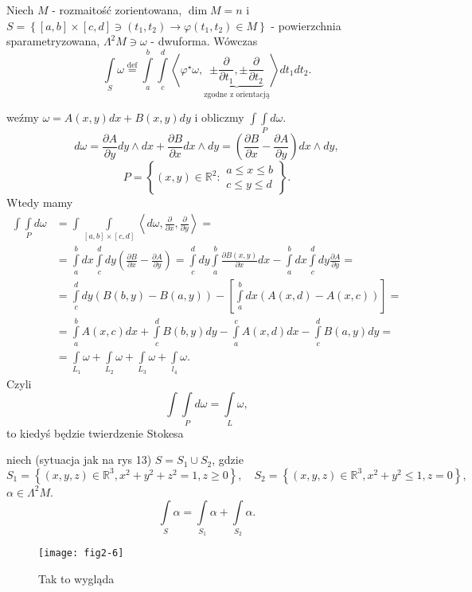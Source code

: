 \documentclass[../main.tex]{subfiles}
\begin{document}
\pagebreak
\begin{definicja}
    Niech $M$ - rozmaitość zorientowana, $\dim M = n$ i \\
    $S = \left\{ [a,b]\times[c,d]\ni (t_1,t_2) \to \varphi(t_1,t_2)\in M \right\}$ - powierzchnia sparametryzowana, $\Lambda^2M\ni\omega$ - dwuforma. Wówczas
    \[
        \int\limits_S \omega \overset{\text{def}}{=} \int\limits_a^b\int\limits_c^d \left<\varphi^\star\omega, \underbrace{\pm \frac{\partial }{\partial t_1} , \pm \frac{\partial }{\partial t_2}}_\text{zgodne z orientacją}\right>dt_1dt_2
    .\]
\end{definicja}
\begin{przyklad}
    weźmy $\omega = A(x,y)dx + B(x,y)dy$ i obliczmy $\int\int\limits_P d\omega$.
     \[
         d\omega = \frac{\partial A}{\partial y} dy\land dx + \frac{\partial B}{\partial x} dx\land dy = \left(\frac{\partial B}{\partial x} - \frac{\partial A}{\partial y} \right)dx\land dy
    ,\]
\[
    P = \left\{ (x,y)\in \mathbb{R}^2: \begin{matrix}a\le x\le b\\ c\le y \le d \end{matrix} \right\}
.\]
Wtedy mamy
\begin{align*}
    \int\int\limits_P d\omega &= \int\int\limits_{[a,b]\times[c,d]} \left<d\omega, \frac{\partial }{\partial x} , \frac{\partial }{\partial y}  \right> = \\
    &= \int\limits_a^b dx \int\limits_c^d dy\left(\frac{\partial B}{\partial x} - \frac{\partial A}{\partial y} \right) = \int\limits_c^d dy\int\limits_a^b \frac{\partial B(x,y)}{\partial x} dx - \int\limits_a^bdx\int\limits_c^ddy \frac{\partial A}{\partial y} = \\
    &= \int\limits_c^d dy(B(b,y) - B(a,y)) - \left[ \int\limits_a^bdx \left( A(x,d) - A(x,c) \right)  \right] = \\
    &= \int\limits_a^bA(x,c)dx + \int\limits_c^dB(b,y)dy - \int\limits_a^cA(x,d)dx - \int\limits_c^dB(a,y)dy =\\
    &= \int\limits_{L_1}\omega + \int\limits_{L_2}\omega + \int\limits_{L_3}\omega + \int\limits_{l_4}\omega
.\end{align*}
Czyli \[
\int\int\limits_Pd\omega = \int\limits_L \omega
,\]
to kiedyś będzie twierdzenie Stokesa
\end{przyklad}
\begin{przyklad}
    niech (sytuacja jak na rys 13) $S = S_1\cup S_2$, gdzie
    \[
        S_1 = \left\{ (x,y,z)\in \mathbb{R}^3, x^2 + y^2 + z^2 = 1, z\ge 0 \right\},\quad S_2 = \left\{ (x,y,z)\in \mathbb{R}^3, x^2+y^2 \le 1, z = 0 \right\}
    ,\]
$\alpha\in \Lambda^2M$.
\[
\int\limits_S \alpha = \int\limits_{S_1}\alpha + \int\limits_{S_2}\alpha
.\]
    \begin{figure}[h]
        \centering
        \texttt{[image: fig2-6]}
        \caption{Tak to wygląda}
        \label{fig:fig2-6}
    \end{figure}
\end{przyklad}
\end{document}
